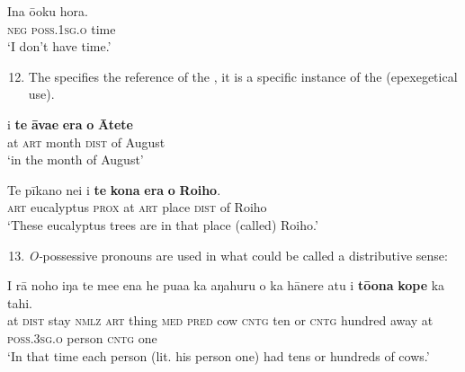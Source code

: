 \ea\label{ex:6.96}
\gll {\ꞌ}Ina ō{\ꞌ}oku hora. \\
\textsc{neg} \textsc{poss.1sg.o} time \\

\glt
‘I don’t have time.’  
\z

\begin{enumerate}
\setcounter{enumi}{11}
\item 
The  specifies the reference of the , it is a specific instance of the  (epexegetical use).

\end{enumerate}

\ea\label{ex:6.97}
\gll {\ꞌ}i \textbf{te} \textbf{{\ꞌ}āva{\ꞌ}e} \textbf{era} \textbf{o} \textbf{{\ꞌ}Ātete} \\
at \textsc{art} month \textsc{dist} of August \\

\glt 
‘in the month of August’ \textstyleExampleref{[R250.063]} 
\z

\ea\label{ex:6.98}
\gll Te pīkano nei {\ꞌ}i \textbf{te} \textbf{kona} \textbf{era} \textbf{o} \textbf{Roiho}. \\
\textsc{art} eucalyptus \textsc{prox} at \textsc{art} place \textsc{dist} of Roiho \\

\glt
‘These eucalyptus trees are in that place (called) Roiho.’ \textstyleExampleref{[R130.008]} 
\z

\begin{enumerate}
\setcounter{enumi}{12}
\item 
\textit{O-}possessive pronouns are used in what could be called a distributive sense:

\end{enumerate}

\ea\label{ex:6.99}
\gll {\ꞌ}I rā noho iŋa te me{\ꞌ}e ena he pua{\ꞌ}a ka {\ꞌ}aŋahuru {\ꞌ}o ka hānere  atu i \textbf{tō{\ꞌ}ona} \textbf{kope} ka tahi.\\
at \textsc{dist} stay \textsc{nmlz} \textsc{art} thing \textsc{med} \textsc{pred} cow \textsc{cntg} ten or \textsc{cntg} hundred  away at \textsc{poss.3sg.o} person \textsc{cntg} one\\

\glt 
‘In that time each person (lit. his person one) had tens or hundreds of cows.’ \textstyleExampleref{[R107.035]} 
\z

